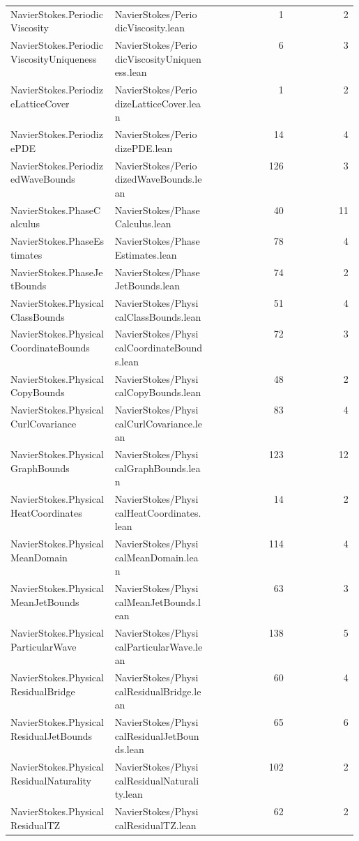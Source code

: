 \begin{longtable}{p{0.30\linewidth}p{0.28\linewidth}rr}
NavierStokes.PeriodicViscosity & NavierStokes/PeriodicViscosity.lean & 1 & 2\\
NavierStokes.PeriodicViscosityUniqueness & NavierStokes/PeriodicViscosityUniqueness.lean & 6 & 3\\
NavierStokes.PeriodizeLatticeCover & NavierStokes/PeriodizeLatticeCover.lean & 1 & 2\\
NavierStokes.PeriodizePDE & NavierStokes/PeriodizePDE.lean & 14 & 4\\
NavierStokes.PeriodizedWaveBounds & NavierStokes/PeriodizedWaveBounds.lean & 126 & 3\\
NavierStokes.PhaseCalculus & NavierStokes/PhaseCalculus.lean & 40 & 11\\
NavierStokes.PhaseEstimates & NavierStokes/PhaseEstimates.lean & 78 & 4\\
NavierStokes.PhaseJetBounds & NavierStokes/PhaseJetBounds.lean & 74 & 2\\
NavierStokes.PhysicalClassBounds & NavierStokes/PhysicalClassBounds.lean & 51 & 4\\
NavierStokes.PhysicalCoordinateBounds & NavierStokes/PhysicalCoordinateBounds.lean & 72 & 3\\
NavierStokes.PhysicalCopyBounds & NavierStokes/PhysicalCopyBounds.lean & 48 & 2\\
NavierStokes.PhysicalCurlCovariance & NavierStokes/PhysicalCurlCovariance.lean & 83 & 4\\
NavierStokes.PhysicalGraphBounds & NavierStokes/PhysicalGraphBounds.lean & 123 & 12\\
NavierStokes.PhysicalHeatCoordinates & NavierStokes/PhysicalHeatCoordinates.lean & 14 & 2\\
NavierStokes.PhysicalMeanDomain & NavierStokes/PhysicalMeanDomain.lean & 114 & 4\\
NavierStokes.PhysicalMeanJetBounds & NavierStokes/PhysicalMeanJetBounds.lean & 63 & 3\\
NavierStokes.PhysicalParticularWave & NavierStokes/PhysicalParticularWave.lean & 138 & 5\\
NavierStokes.PhysicalResidualBridge & NavierStokes/PhysicalResidualBridge.lean & 60 & 4\\
NavierStokes.PhysicalResidualJetBounds & NavierStokes/PhysicalResidualJetBounds.lean & 65 & 6\\
NavierStokes.PhysicalResidualNaturality & NavierStokes/PhysicalResidualNaturality.lean & 102 & 2\\
NavierStokes.PhysicalResidualTZ & NavierStokes/PhysicalResidualTZ.lean & 62 & 2\\

\end{longtable}
